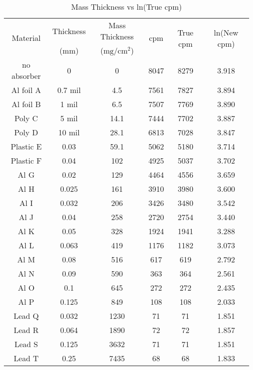 \documentclass[11pt]{article}
\begin{document}
	\begin{table}[htbp]
		\centering
		\caption{\centering Mass Thickness vs ln(True cpm)}
		\begin{tabular}{cccccc}
			\toprule
			\multirow{2}[4]{*}{Material} & Thickness & Mass Thickness & \multirow{2}[4]{*}{cpm} & \multirow{2}[4]{*}{True cpm} & \multirow{2}[4]{*}{ln(New cpm)} \\
			\cmidrule{2-3}      & ($\unit{\milli\meter}$) & ($\unit{\milli\gram\per\centi\meter\squared}$) &   &   &  \\
			\midrule
			no absorber & 0 & 0 & 8047 & 8279 & 3.918 \\
			Al foil A & 0.7 mil & 4.5 & 7561 & 7827 & 3.894 \\
			Al foil B & 1 mil & 6.5 & 7507 & 7769 & 3.890 \\
			Poly C & 5 mil & 14.1 & 7444 & 7702 & 3.887 \\
			Poly D & 10 mil & 28.1 & 6813 & 7028 & 3.847 \\
			Plastic E & 0.03 & 59.1 & 5062 & 5180 & 3.714 \\
			Plastic F & 0.04 & 102 & 4925 & 5037 & 3.702 \\
			Al G & 0.02 & 129 & 4464 & 4556 & 3.659 \\
			Al H & 0.025 & 161 & 3910 & 3980 & 3.600 \\
			Al I & 0.032 & 206 & 3426 & 3480 & 3.542 \\
			Al J & 0.04 & 258 & 2720 & 2754 & 3.440 \\
			Al K & 0.05 & 328 & 1924 & 1941 & 3.288 \\
			Al L & 0.063 & 419 & 1176 & 1182 & 3.073 \\
			Al M & 0.08 & 516 & 617 & 619 & 2.792 \\
			Al N & 0.09 & 590 & 363 & 364 & 2.561 \\
			Al O & 0.1 & 645 & 272 & 272 & 2.435 \\
			Al P & 0.125 & 849 & 108 & 108 & 2.033 \\
			Lead Q & 0.032 & 1230 & 71 & 71 & 1.851 \\
			Lead R & 0.064 & 1890 & 72 & 72 & 1.857 \\
			Lead S & 0.125 & 3632 & 71 & 71 & 1.851 \\
			Lead T & 0.25 & 7435 & 68 & 68 & 1.833 \\
			\bottomrule
		\end{tabular}%
		\label{tab:10_Table}%
	\end{table}%
	
\end{document}
